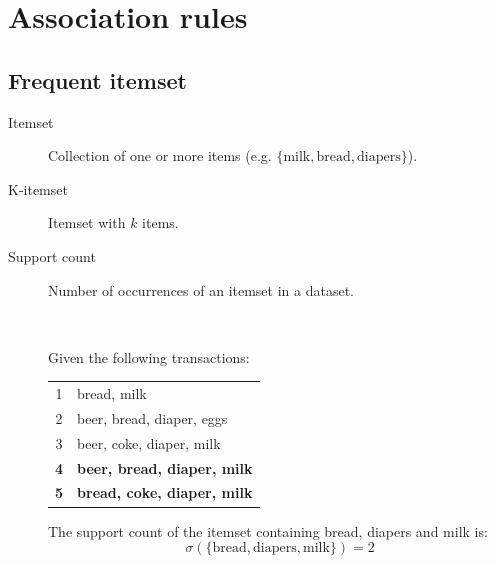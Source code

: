 \chapter{Association rules}


\section{Frequent itemset}

\begin{description}
    \item[Itemset] 
        Collection of one or more items (e.g. $\{ \text{milk}, \text{bread}, \text{diapers} \}$).

    \item[K-itemset] 
        Itemset with $k$ items.

    \item[Support count] 
        Number of occurrences of an itemset in a dataset.
        \begin{example}
            \phantom{}\\
            \begin{minipage}{0.4\textwidth}
                Given the following transactions:
                \begin{center}
                    \begin{tabular}{|c|l|}
                        \hline
                        1 & bread, milk \\
                        2 & beer, bread, diaper, eggs \\
                        3 & beer, coke, diaper, milk \\
                        \textbf{4} & \textbf{beer, bread, diaper, milk} \\
                        \textbf{5} & \textbf{bread, coke, diaper, milk} \\
                        \hline
                    \end{tabular}
                \end{center}
            \end{minipage}
            \begin{minipage}{0.5\textwidth}
                The support count of the itemset containing bread, diapers and milk is:
                \[ \sigma(\{ \text{bread}, \text{diapers}, \text{milk} \}) = 2 \]
            \end{minipage}
        \end{example}


\end{description}
